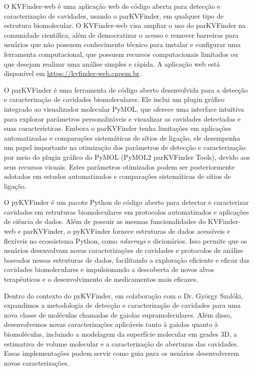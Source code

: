 \documentclass[Portugues]{phdquali}
\begin{document}
O KVFinder-web é uma aplicação web de código aberta para detecção e caracterização de cavidades, usando o parKVFinder, em qualquer tipo de estrutura biomolecular. O KVFinder-web visa ampliar o uso do parKVFinder na comunidade científica, além de democratizar o acesso e remover barreiras para usuários que não possuem conhecimento técnico para instalar e configurar uma ferramenta computacional, que possuem recursos computacionais limitados ou que desejam realizar uma análise simples e rápida. A aplicação web está disponível em \url{https://kvfinder-web.cnpem.br}.

O parKVFinder é uma ferramenta de código aberto desenvolvida para a detecção e caracterização de cavidades biomoleculares. Ele inclui um plugin gráfico integrado ao visualizador molecular PyMOL, que oferece uma interface intuitiva para explorar parâmetros personalizáveis e visualizar as cavidades detectadas e suas características. Embora o parKVFinder tenha limitações em aplicações automatizadas e comparações sistemáticas de sítios de ligação, ele desempenha um papel importante na otimização dos parâmetros de detecção e caracterização por meio do plugin gráfico do PyMOL (PyMOL2 parKVFinder Tools), devido aos seus recursos visuais. Estes parâmetros otimizados podem ser posteriormente adotados em estudos automatizados e comparações sistemáticas de sítios de ligação.

O pyKVFinder é um pacote Python de código aberto para detectar e caracterizar cavidades em estruturas biomoleculares em protocolos automatizados e aplicações de ciência de dados. Além de possuir as mesmas funcionalidades do KVFinder-web e parKVFinder, o pyKVFinder fornece estruturas de dados acessíveis e flexíveis no ecossistema Python, como \textit{ndarrays} e dicionários. Isso permite que os usuários desenvolvam novas caracterizações de cavidades e protocolos de análise baseados nessas estruturas de dados, facilitando a exploração eficiente e eficaz das cavidades biomoleculares e impulsionando a descoberta de novos alvos terapêuticos e o desenvolvimento de medicamentos mais eficazes.

Dentro do contexto do pyKVFinder, em colaboração com o Dr. György Szalóki, expandimos a metodologia de detecção e caracterização de cavidades para uma nova classe de moléculas chamadas de gaiolas supramoleculares. Além disso, desenvolvemos novas caracterizações aplicáveis tanto à gaiolas quanto à biomoléculas, incluindo a modelagem da superfície molecular em grades 3D, a estimativa de volume molecular e a caracterização de aberturas das cavidades. Essas implementações podem servir como guia para os usuários desenvolverem novas caracterizações.
\end{document}
